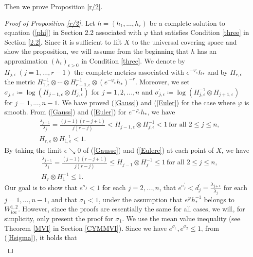 \documentclass[12pt]{article}
\theoremstyle{definition}
\def\refe{\ast}
\begin{document}
Then we prove Proposition \ref{r/2}.
\begin{proof}[Proof of Proposition \ref{r/2}] Let $h=(h_1,\dots, h_r)$ be a complete solution to equation (\ref{phi}) in Section {2.2} associated with $\varphi$ that satisfies Condition \ref{three} in Section \ref{2.2}. Since it is sufficient to lift $X$ to the universal covering space and show the proposition, we will assume from the beginning that $h$ has an approximation $(h_\epsilon)_{\epsilon>0}$ in Condition \ref{three}. We denote by $H_{j,\epsilon} \ (j=1,\dots, r-1)$ the complete metrics associated with $e^{-\varphi_\epsilon}h_\ast$ and by $H_{r,\epsilon}$ the metric $ H_{1,\epsilon}^{-1}\otimes \cdots \otimes H_{r-1,\epsilon}^{-1} \otimes (e^{-\varphi_\epsilon}h_\refe)^{-r}$. Moreover, we set $\sigma_{j,\epsilon}\coloneqq \log(H_{j-1,\epsilon}\otimes H_{j,\epsilon}^{-1})$ for $j=1,2,\dots, n$ and $\sigma_{j,\epsilon}^\prime\coloneqq \log(H_{j,\epsilon}^{-1}\otimes H_{j+1,\epsilon})$ for $j=1,\dots, n-1$. We have proved (\ref{Gauss}) and (\ref{Euler}) for the case where $\varphi$ is smooth. From (\ref{Gauss}) and (\ref{Euler}) for $e^{-\varphi_\epsilon}h_\refe$, we have
\begin{align}
&\frac{\lambda_{j-1}}{\lambda_j}=\frac{(j-1)(r-j+1)}{j(r-j)}<H_{j-1,\epsilon}\otimes H_{j,\epsilon}^{-1}<1 \ \text{for all $2\leq j\leq n$},\label{Gausse}\\
& H_{r,\epsilon}\otimes H_{1,\epsilon}^{-1}<1. \label{Eulere}
\end{align}
By taking the limit $\epsilon\searrow 0$ of (\ref{Gausse}) and (\ref{Eulere}) at each point of $X$, we have 
\begin{align}
&\frac{\lambda_{j-1}}{\lambda_j}=\frac{(j-1)(r-j+1)}{j(r-j)}\leq H_{j-1}\otimes H_j^{-1}\leq 1 \ \text{for all $2\leq j\leq n$},\label{Gauss0}\\
& H_r\otimes H_1^{-1}\leq 1. \label{Euler0}
\end{align}
Our goal is to show that $e^{\sigma_j} < 1$ for each $j = 2, \dots, n$, that $e^{\sigma_j^\prime} < d_j^\prime = \frac{\lambda_{j+1}}{\lambda_j}$ for each $j = 1, \dots, n - 1$, and that $\sigma_1 < 1$, under the assumption that $e^\varphi h_\refe^{-1}$ belongs to $W^{1,2}_{loc}$. However, since the proofs are essentially the same for all cases, we will, for simplicity, only present the proof for $\sigma_1$. We use the mean value inequality (see Theorem \ref{MVI} in Section \ref{CYMMVI}). Since we have $e^{\sigma_1}, e^{\sigma_2}\leq 1$, from (\ref{Hsigma}), it holds that
\begin{align}

\end{align}
\end{proof}
\end{document}

